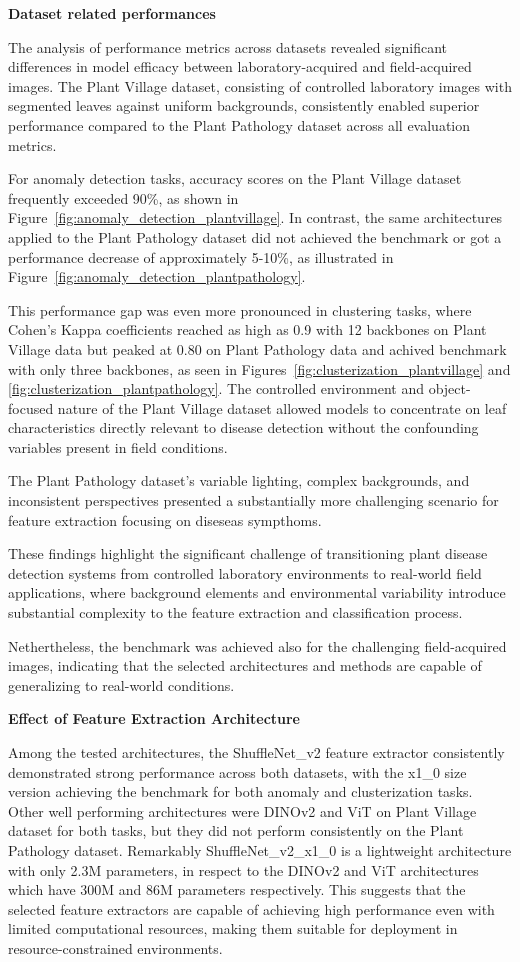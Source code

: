 \documentclass[12pt,a4paper,oneside]{report}
\begin{document}
\textbf{Dataset related performances}

The analysis of performance metrics across datasets revealed significant differences 
in model efficacy between laboratory-acquired and field-acquired images. 
The Plant Village dataset, consisting of controlled laboratory images with segmented 
leaves against uniform backgrounds, consistently enabled superior performance compared 
to the Plant Pathology dataset across all evaluation metrics.

For anomaly detection tasks, accuracy scores on the Plant Village dataset frequently 
exceeded 90\%, as shown in Figure~\ref{fig:anomaly_detection_plantvillage}. In contrast, 
the same architectures applied to the Plant Pathology dataset did not achieved
the benchmark or got a performance decrease of approximately 
5-10\%, as illustrated in Figure~\ref{fig:anomaly_detection_plantpathology}.

This performance gap was even more pronounced in clustering tasks, where Cohen's Kappa 
coefficients reached as high as 0.9 with 12 backbones on Plant Village data but 
peaked at 0.80 on 
Plant Pathology data and achived benchmark with only three backbones, 
as seen in Figures~\ref{fig:clusterization_plantvillage} and 
\ref{fig:clusterization_plantpathology}. The controlled environment and object-focused 
nature of the Plant Village dataset allowed models to concentrate on leaf 
characteristics directly relevant to disease detection without the confounding 
variables present in field conditions.

The Plant Pathology dataset's variable lighting, complex backgrounds, and inconsistent 
perspectives presented a substantially more challenging scenario for feature extraction
focusing on diseseas sympthoms.

These findings highlight the significant challenge of transitioning plant disease 
detection systems from controlled laboratory environments to real-world field 
applications, where background elements and environmental variability introduce 
substantial complexity to the feature extraction and classification process.

Nethertheless, the benchmark was achieved also for the challenging field-acquired
images, indicating that the selected architectures and methods are capable of
generalizing to real-world conditions.

\textbf{Effect of Feature Extraction Architecture}

Among the tested architectures, the ShuffleNet\_v2 feature extractor consistently demonstrated strong 
performance across both datasets, with the x1\_0 size version achieving 
the benchmark for both anomaly and clusterization tasks.
Other well performing architectures
were DINOv2 and ViT on Plant Village dataset for both tasks, but they did not 
perform consistently on the Plant Pathology dataset.
Remarkably ShuffleNet\_v2\_x1\_0 is a lightweight architecture with only 2.3M parameters,
in respect to the DINOv2 and ViT architectures which have 300M and 86M parameters respectively.
This suggests that the selected feature extractors are capable of achieving high performance
even with limited computational resources, making them suitable for deployment in
resource-constrained environments. 
\end{document}
